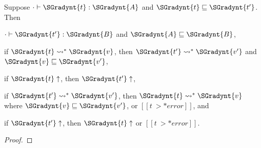 \begin{theorem}
  \label{thm:gradual_guarantee}
  Suppose $  \cdot   \vdash  \SGradynt{t}  :  \SGradynt{A} $ and $ \SGradynt{t}  \sqsubseteq  \SGradynt{t'} $.  Then
  \begin{enumR}
  \item $  \cdot   \vdash  \SGradynt{t'}  :  \SGradynt{B} $ and $ \SGradynt{A}  \sqsubseteq  \SGradynt{B} $,
  \item if $ \SGradynt{t}  \rightsquigarrow^*  \SGradynt{v} $, then $ \SGradynt{t'}  \rightsquigarrow^*  \SGradynt{v'} $ and $ \SGradynt{v}  \sqsubseteq  \SGradynt{v'} $,
  \item if $ \SGradynt{t}  \uparrow $, then $ \SGradynt{t'}  \uparrow $,
  \item if $ \SGradynt{t'}  \rightsquigarrow^*  \SGradynt{v'} $, then $ \SGradynt{t}  \rightsquigarrow^*  \SGradynt{v} $ where $ \SGradynt{v}  \sqsubseteq  \SGradynt{v'} $, or $[[t ~>* error]]$, and
  \item if $ \SGradynt{t'}  \uparrow $, then $ \SGradynt{t}  \uparrow $ or $[[t ~>* error]]$.
  \end{enumR}
\end{theorem}
\begin{proof}
  
\end{proof}


